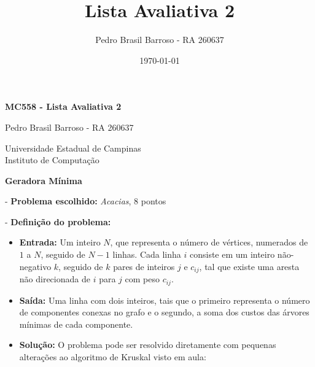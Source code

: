 \documentclass[
    12pt,
    a4paper,
    brazil,
    english
]{article}
\title{Lista Avaliativa 2}
\author{Pedro Brasil Barroso - RA 260637}
\date{\today} %
\begin{document}
\begin{titlepage}
    \centering

    \vspace*{6cm}

    {\LARGE \textbf{MC558 - Lista Avaliativa 2}}
    
    \vspace{5.5cm}
    {\Large Pedro Brasil Barroso - RA 260637}

    \vfill

    {\Large Universidade Estadual de Campinas} \\ %
    {\Large Instituto de Computação} \\

    \vspace{1cm}
\end{titlepage}

\textbf{ Geradora Mínima}
\vspace{0.5cm}

- \textbf{Problema escolhido:} \textit{Acacias}, 8 pontos

\vspace{0.25cm}

- \textbf{Definição do problema:}
\begin{itemize}
    \item \textbf{Entrada:} Um inteiro $N$, que representa o número de vértices, numerados de $1$ a $N$,
    seguido de $N - 1$ linhas. Cada linha $i$ consiste em um inteiro não-negativo $k$, seguido de $k$
    pares de inteiros $j$ e $c_{ij}$, tal que existe uma aresta não direcionada de $i$ para $j$ com peso $c_{ij}$.
    \item \textbf{Saída:} Uma linha com dois inteiros, tais que o primeiro representa o número de componentes conexas no grafo e o segundo, a soma dos custos das árvores mínimas de cada componente.
    \item \textbf{Solução:} O problema pode ser resolvido diretamente com pequenas alterações ao algoritmo de Kruskal visto em aula:
\end{itemize}
\end{document}
